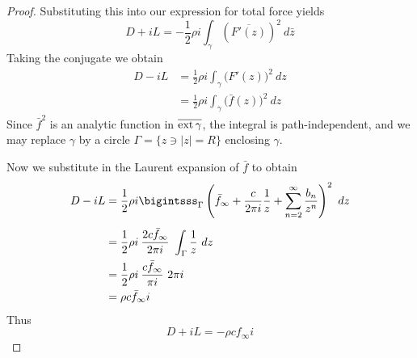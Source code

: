 \documentclass[letterpaper, twoside, 12 pt]{article}
\begin{document}
\begin{proof}
		
		Substituting this into our expression for total force yields
		\[
			D + iL = - \frac{1}{2} \rho i \int_\gamma \left( \overline{F'(z)} \right)^2 \ d \bar z  
		\]
		Taking the conjugate we obtain
		\begin{align*}
			D - iL &= \frac{1}{2} \rho i \int_\gamma \big( F'(z) \big)^2 \ dz \\
			&= \frac{1}{2} \rho i \int_\gamma \big( \bar f(z) \big)^2 \ dz  
		\end{align*}
		Since $\bar f^2$ is an analytic function in $\overline{\operatorname*{ext} \gamma}$, the integral is path-independent, and we may replace $\gamma$ by a circle $\Gamma = \{ z \ni |z| = R \}$ enclosing $\gamma$.

		Now we substitute in the Laurent expansion of $\bar f$ to obtain
		\begin{align*}
			D - iL &= \frac{1}{2} \rho i \bigintsss_\Gamma \left( \bar f_\infty + \frac{c}{2 \pi i} \frac{1}{z} + \sum_{n=2}^\infty \frac{b_n}{z^n} \right)^2 \ dz \\[1 ex]
			&= \frac{1}{2} \rho i \> \frac{2 c \bar f_\infty}{2 \pi i} \ \int_\Gamma \frac{1}{z} \ dz \\
			&= \frac{1}{2} \rho i \> \frac{c \bar f_\infty}{\pi i} \ 2 \pi i \\
			&= \rho c \bar f_\infty i
		\end{align*}
		Thus
		\[
			D + iL = - \rho c f_\infty i
		\]
	\end{proof}


\clearpage
\nocite{*}


\end{document}
